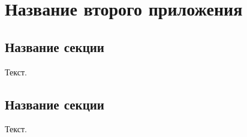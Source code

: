 
\chapter{Название второго приложения}
\label{app2}

\section{Название секции}
\label{app2:sec1}

Текст.

\section{Название секции}
\label{app2:sec2}

Текст.

